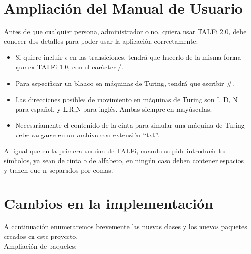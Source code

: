 \documentclass[12pt,a4paper,spanish]{book}
\begin{document}
\newpage
\section{Ampliaci\'on del Manual de Usuario}
Antes de que cualquier persona, administrador o no, quiera usar TALFi 2.0, debe conocer dos detalles para poder usar la aplicaci\'on correctamente:\\
\begin{itemize}
\item Si quiere incluir $\epsilon$ en las transiciones, tendr\'a que hacerlo de la misma forma que en TALFi 1.0, con el car\'acter /.
\item Para especificar un blanco en m\'aquinas de Turing, tendr\'a que escribir $\#$.
\item Las direcciones posibles de movimiento en m\'aquinas de Turing son I, D, N para espa\~nol, y L,R,N para ingl\'es. Ambas siempre en may\'usculas.
\item Necesariamente el contenido de la cinta para simular una m\'aquina de Turing debe cargarse en un archivo con extensi\'on ``txt''.
\end{itemize}
Al igual que en la primera versi\'on de TALFi, cuando se pide introducir los s\'imbolos, ya sean de cinta o de alfabeto, en ning\'un caso deben contener espacios y tienen que ir separados por comas.

\newpage
\section{Cambios en la implementaci\'on}
A continuaci\'on enumeraremos brevemente las nuevas clases y los nuevos paquetes creados en este proyecto.\\
Ampliaci\'on de paquetes:
\end{document}
